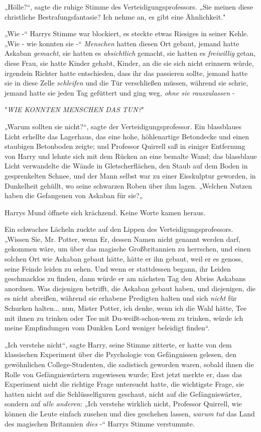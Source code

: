 {„Hölle?“, sagte die ruhige Stimme des Verteidigungsprofessors. „Sie meinen diese christliche Bestrafungsfantasie? Ich nehme an, es gibt eine Ähnlichkeit."

„Wie -“ Harrys Stimme war blockiert, es steckte etwas Riesiges in seiner Kehle. „Wie - wie konnten sie -“ \emph{Menschen} hatten diesen Ort gebaut, jemand hatte Askaban \emph{gemacht}, sie hatten es \emph{absichtlich} gemacht, sie hatten es \emph{freiwillig} getan, diese Frau, sie hatte Kinder gehabt, Kinder, an die sie sich nicht erinnern würde, irgendein Richter hatte entschieden, dass ihr das passieren sollte, jemand hatte sie in diese Zelle \emph{schleifen} und die Tür verschließen müssen, während sie schrie, jemand hatte sie jeden Tag gefüttert und ging weg, \emph{ohne sie rauszulassen} -

"\emph{WIE KONNTEN MENSCHEN DAS TUN?}"

„Warum sollten sie nicht?“, sagte der Verteidigungsprofessor. Ein blassblaues Licht erhellte das Lagerhaus, das eine hohe, höhlenartige Betondecke und einen staubigen Betonboden zeigte; und Professor Quirrell saß in einiger Entfernung von Harry und lehnte sich mit dem Rücken an eine bemalte Wand; das blassblaue Licht verwandelte die Wände in Gletscherflächen, den Staub auf dem Boden in gesprenkelten Schnee, und der Mann selbst war zu einer Eisskulptur geworden, in Dunkelheit gehüllt, wo seine schwarzen Roben über ihm lagen. „Welchen Nutzen haben die Gefangenen von Askaban für sie?„

Harrys Mund öffnete sich krächzend. Keine Worte kamen heraus.

Ein schwaches Lächeln zuckte auf den Lippen des Verteidigungsprofessors. „Wissen Sie, Mr. Potter, wenn Er, dessen Namen nicht genannt werden darf, gekommen wäre, um über das magische Großbritannien zu herrschen, und einen solchen Ort wie Askaban gebaut hätte, hätte er ihn gebaut, weil er es genoss, seine Feinde leiden zu sehen. Und wenn er stattdessen begann, ihr Leiden geschmacklos zu finden, dann würde er am nächsten Tag den Abriss Askabans anordnen. Was diejenigen betrifft, die Askaban gebaut haben, und diejenigen, die es nicht abreißen, während sie erhabene Predigten halten und sich \emph{nicht} für Schurken halten... nun, Mister Potter, ich denke, wenn ich die Wahl hätte, Tee mit ihnen zu trinken oder Tee mit Du-weißt-schon-wem zu trinken, würde ich meine Empfindungen vom Dunklen Lord weniger beleidigt finden“.

„Ich verstehe nicht“, sagte Harry, seine Stimme zitterte, er hatte von dem klassischen Experiment über die Psychologie von Gefängnissen gelesen, den gewöhnlichen College-Studenten, die sadistisch geworden waren, sobald ihnen die Rolle von Gefängniswärtern zugewiesen wurde; Erst jetzt merkte er, dass das Experiment nicht die richtige Frage untersucht hatte, die wichtigste Frage, sie hatten nicht auf die Schlüsselfiguren geschaut, nicht auf die Gefängniswärter, sondern auf \emph{alle anderen}: „Ich verstehe wirklich nicht, Professor Quirrell, wie können die Leute einfach zusehen und dies geschehen lassen, \emph{warum} \emph{tut} das Land des magischen Britannien \emph{dies} -“ Harrys Stimme verstummte.

}
